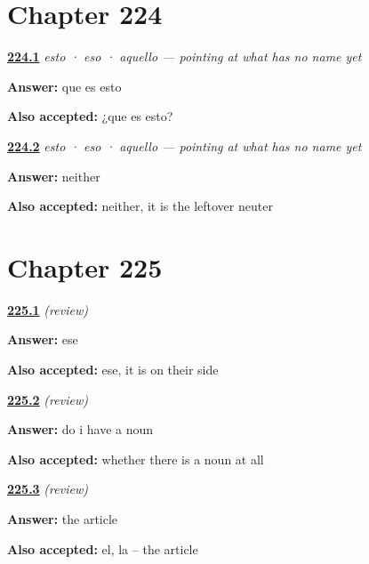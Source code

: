 \section*{Chapter 224}

\noindent\begin{minipage}[t]{\linewidth}
\raggedright
\hyperlink{review-ES-C59-esto-eso-aquello-ask}{\textbf{224.1}} \emph{esto · eso · aquello — pointing at what has no name yet}\par
\small \textbf{Answer:} que es esto\par
\footnotesize \textbf{Also accepted:} ¿que es esto?
\end{minipage}\par\medskip

\noindent\begin{minipage}[t]{\linewidth}
\raggedright
\hyperlink{review-ES-C59-esto-eso-aquello-gender}{\textbf{224.2}} \emph{esto · eso · aquello — pointing at what has no name yet}\par
\small \textbf{Answer:} neither\par
\footnotesize \textbf{Also accepted:} neither, it is the leftover neuter
\end{minipage}\par\medskip

\section*{Chapter 225}

\noindent\begin{minipage}[t]{\linewidth}
\raggedright
\hyperlink{review-ES-C59-repaso-demostrativos-side}{\textbf{225.1}} \emph{(review)}\par
\small \textbf{Answer:} ese\par
\footnotesize \textbf{Also accepted:} ese, it is on their side
\end{minipage}\par\medskip

\noindent\begin{minipage}[t]{\linewidth}
\raggedright
\hyperlink{review-ES-C59-repaso-demostrativos-noun}{\textbf{225.2}} \emph{(review)}\par
\small \textbf{Answer:} do i have a noun\par
\footnotesize \textbf{Also accepted:} whether there is a noun at all
\end{minipage}\par\medskip

\noindent\begin{minipage}[t]{\linewidth}
\raggedright
\hyperlink{review-ES-C59-repaso-demostrativos-article}{\textbf{225.3}} \emph{(review)}\par
\small \textbf{Answer:} the article\par
\footnotesize \textbf{Also accepted:} el, la -- the article
\end{minipage}\par\medskip

